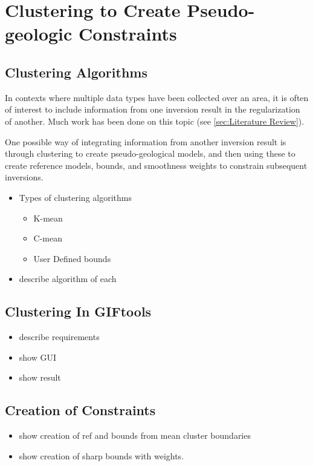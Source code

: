 \section{Clustering to Create Pseudo-geologic Constraints}
\label{sec:cluster}

\subsection{Clustering Algorithms}
\label{subsec:clusterAlgo}

In contexts where multiple data types have been collected over an area, it is often of interest to include information from one inversion result in the regularization of another. Much work has been done on this topic (see \autoref{sec:Literature Review}).

One possible way of integrating information from another inversion result is through clustering to create pseudo-geological models, and then using these to create reference models, bounds, and smoothness weights to constrain subsequent inversions.

\begin{itemize}
 \item Types of clustering algorithms
 \begin{itemize}
  \item K-mean
  \item C-mean
  \item User Defined bounds
 \end{itemize}
 \item describe algorithm of each
\end{itemize}

\subsection{Clustering In GIFtools}
\label{subsec:clusterTools}

\begin{itemize}
 \item describe requirements
 \item show GUI
 \item show result
\end{itemize}

\subsection{Creation of Constraints}
\label{subsec:clusterConstraints}

\begin{itemize}
 \item show creation of ref and bounds from mean cluster boundaries
 \item show creation of sharp bounds with weights.
\end{itemize}

